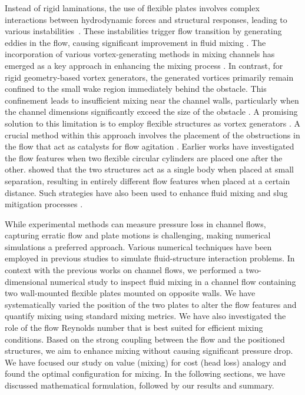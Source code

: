 \documentclass[reprint,a4paper,fleqn]{cas-dc} %
\begin{document}
		
	Instead of rigid laminations, the use of flexible plates involves complex interactions between hydrodynamic forces and structural responses, leading to various instabilities~\citep{ Eloy2008, Zhang2000,Taneda1968, Watanabe2002, Alben2008}. These instabilities trigger flow transition by generating eddies in the flow, causing significant improvement in fluid mixing \citep{Self2019,Aaron2019,Self2024}. The incorporation of various vortex-generating methods in mixing channels has emerged as a key approach in enhancing the mixing process \citep{Ali2015,Khatavkar2007,Dadvand2019,Ali2016,Hosseini2021,Ali_2017,Fuchs2011,Derksen2010, Derksen2010, Fuchs2015}. In contrast, for rigid geometry-based vortex generators, the generated vortices primarily remain confined to the small wake region immediately behind the obstacle. This confinement leads to insufficient mixing near the channel walls, particularly when the channel dimensions significantly exceed the size of the obstacle \citep{Wang2020}. A promising solution to this limitation is to employ flexible structures as vortex generators \citep{Hsiao2014,Park2019,Saleh2019,Zhao2020,Chen2020,Nazari_2020,Self_JFS_2024}.
	A crucial method within this approach involves the placement of the obstructions in the flow that act as catalysts for flow agitation \citep{Abdelhamid2021,Yadav2021,Jing2022,Yu2017}. Earlier works \citep{Huarte2011, Borazjani2009, Wang2017} have investigated the flow features when two flexible circular cylinders are placed one after the other. \cite{Wang2017} showed that the two structures act as a single body when placed at small separation, resulting in entirely different flow features when placed at a certain distance. Such strategies have also been used to enhance fluid mixing \citep{Ward2015} and slug mitigation processes \citep{Mehendale2018}.
	
	While experimental methods can measure pressure loss in channel flows, capturing erratic flow and plate motions is challenging, making numerical simulations a preferred approach. Various numerical techniques have been employed in previous studies to simulate fluid-structure interaction problems. In context with the previous works on channel flows, we performed a two-dimensional numerical study to inspect fluid mixing in a channel flow containing two wall-mounted flexible plates mounted on opposite walls. We have systematically varied the position of the two plates to alter the flow features and quantify mixing using standard mixing metrics. We have also investigated the role of the flow Reynolds number that is best suited for efficient mixing conditions. Based on the strong coupling between the flow and the positioned structures, we aim to enhance mixing without causing significant pressure drop. We have focused our study on value (mixing) for cost (head loss) analogy and found the optimal configuration for mixing. In the following sections, we have discussed mathematical formulation, followed by our results and summary.
		
\end{document}
